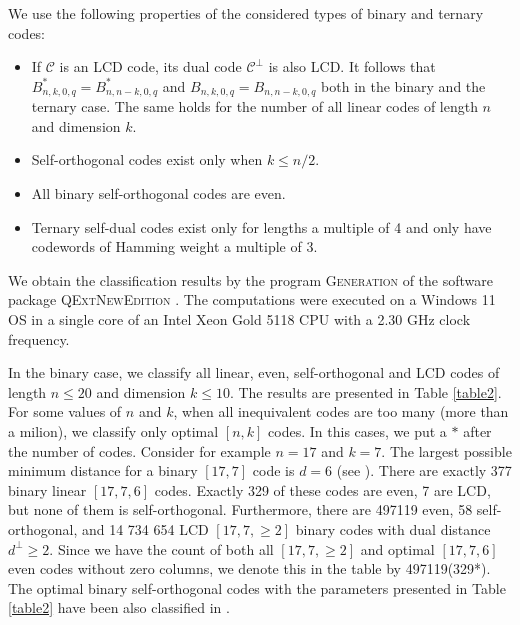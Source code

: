 \documentclass[a4paper,11pt]{article}
\begin{document}
We use the following properties of the considered types of binary and ternary codes:
\begin{itemize}
\item If $\mathcal{C}$ is an LCD code, its dual code $\mathcal{C}^\perp$ is also LCD. It follows that $B_{n,k,0,q}^*=B_{n,n-k,0,q}^*$ and $B_{n,k,0,q}=B_{n,n-k,0,q}$ both in the binary and the ternary case. The same holds for the number of all linear codes of length $n$ and dimension $k$.
\item Self-orthogonal codes exist only when $k\le n/2$.
\item All binary self-orthogonal codes are even.
\item Ternary self-dual codes exist only for lengths a multiple of 4 and only have codewords of Hamming weight a multiple of 3.
\end{itemize}

We obtain the classification results by the program \textsc{Generation} of the software package \textsc{QExtNewEdition} \cite{Generation}. The computations were executed on a Windows 11 OS in a single core of an Intel Xeon Gold 5118 CPU with a 2.30 GHz clock frequency.

In the binary case, we classify all linear, even, self-orthogonal and LCD codes of length $n\le 20$ and dimension $k\le 10$. The results are presented in Table \ref{table2}. For some values of $n$ and $k$, when all inequivalent codes are too many (more than a milion), we classify only optimal $[n,k]$ codes. In this cases, we put a $*$ after the number of codes. Consider for example $n=17$ and $k=7$. The largest possible minimum distance for a binary $[17,7]$ code is $d=6$ (see \cite{Grassl-table}). There are exactly 377 binary linear $[17,7,6]$ codes. Exactly 329 of these codes are even, 7 are LCD, but none of them is self-orthogonal. Furthermore, there are 497119 even, 58 self-orthogonal, and 14 734 654 LCD $[17,7,\ge 2]$ binary codes with dual distance $d^\perp\ge 2$.  Since we have the count of both all $[17,7,\ge 2]$ and optimal $[17,7,6]$ even codes without zero columns, we denote this in the table by 497119(329*). The optimal binary self-orthogonal codes with the parameters presented in Table \ref{table2} have been also classified in \cite{BBGO}.
\end{document}
